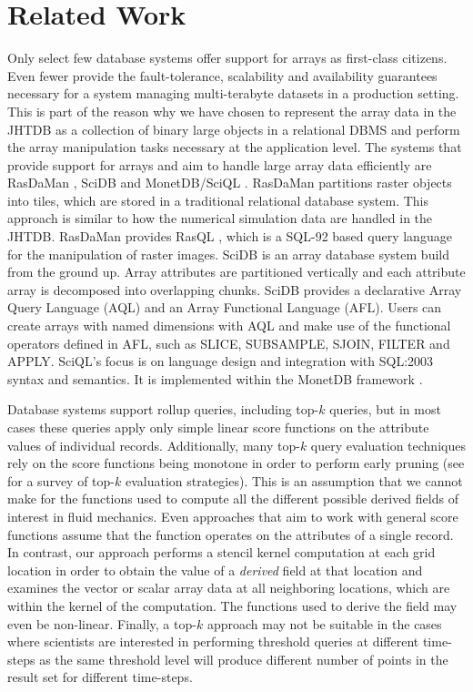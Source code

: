 \documentclass{sig-alternate}
\begin{document}
\section{Related Work}
Only select few database systems offer support for arrays as first-class citizens. Even fewer provide the fault-tolerance, scalability and availability guarantees 
necessary for a system managing multi-terabyte datasets in a production setting. This is part of the reason why we have chosen to represent the array
data in the JHTDB as a collection of binary large objects in a relational DBMS and perform the array manipulation tasks necessary at the application level.
The systems that provide
support for arrays and aim to handle large array data efficiently are RasDaMan \cite{Rasdaman}, SciDB \cite{Scidb} and MonetDB/SciQL \cite{Sciql}. RasDaMan
partitions raster objects into tiles, which are stored in a traditional relational database system. This approach is similar to how the numerical simulation data
are handled in the JHTDB. RasDaMan provides RasQL \cite{Rasql}, which is a SQL-92 based query language for the manipulation of raster images. SciDB
is an array database system build from the ground up. Array attributes are partitioned vertically and each attribute array is decomposed into overlapping
chunks. SciDB provides a declarative Array Query Language (AQL) and an Array Functional Language (AFL). Users can create arrays with named
dimensions with AQL and make use of the functional operators defined in AFL, such
as SLICE, SUBSAMPLE, SJOIN, FILTER and APPLY. SciQL's focus is on language design and integration with SQL:2003 syntax and semantics. It is implemented
within the MonetDB framework \cite{MonetDB}.

Database systems support rollup queries, including top-$k$ queries, but in most cases these
queries apply only simple linear score functions on the attribute values of individual records.
Additionally, many top-$k$ query evaluation techniques rely on the score functions being monotone in order to perform early pruning (see \cite{Ilyas} for a
survey of top-$k$ evaluation strategies).
This is an assumption that we cannot make for the functions used to compute all the different possible derived fields of interest in fluid mechanics.
Even approaches that aim to work with general score functions \cite{Deshpande, Xin} assume that the function operates on the attributes of a single record.
In contrast, our approach performs a stencil kernel computation at each grid location in order to obtain the value of a \emph{derived} field at that location and
examines the vector or scalar array data at all neighboring locations, which
are within the kernel of the computation. The functions used to derive the field may even be non-linear.
Finally, a top-$k$ approach may not be suitable in the cases where scientists are interested in performing threshold queries at different time-steps as the
same threshold level will produce different number of points in the result set for different time-steps.
\end{document}
